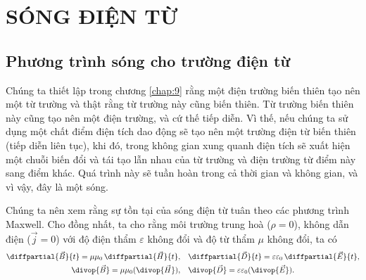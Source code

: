 

\chapter[SÓNG ĐIỆN TỪ]{SÓNG ĐIỆN TỪ}\label{chap:15}

\section{Phương trình sóng cho trường điện từ}\label{sec:15_1}

Chúng ta thiết lập trong chương \ref{chap:9} rằng một điện trường biến thiên tạo nên một từ trường và thật rằng từ trường này cũng biến thiên. Từ trường biến thiên này cũng tạo nên một điện trường, và cứ thế tiếp diễn. Vì thế, nếu chúng ta sử dụng một chất điểm điện tích dao động sẽ tạo nên một trường điện từ 
biến thiên (tiếp diễn liên tục), khi đó, trong không gian xung quanh điện tích sẽ xuất hiện một chuỗi biến đổi và tái tạo 
lẫn nhau của từ trường và điện trường từ điểm này sang điểm khác.
Quá trình này sẽ tuần hoàn trong cả thời gian và không gian, và vì vậy, đây là một sóng.

Chúng ta nên xem rằng sự tồn tại của sóng điện từ tuân theo các phương trình Maxwell. Cho đồng nhất, ta cho rằng môi
trường trung hoà ($\rho=0$), không dẫn điện ($\vec{j}=0$) với độ điện thẩm $\varepsilon$ không đổi và độ từ thẩm $\mu$
không đổi, ta có
\begin{align*}
    \diffpartial{\vec{B}}{t} = \mu\mu_0\, \diffpartial{\vec{H}}{t},&\quad \diffpartial{\vec{D}}{t} = \varepsilon\varepsilon_0\, \diffpartial{\vec{E}}{t},\\
    \divop{\vec{B}} = \mu\mu_0 (\divop{\vec{H}}),&\quad \divop{\vec{D}} = \varepsilon\varepsilon_0 (\divop{\vec{E}}).
\end{align*}

